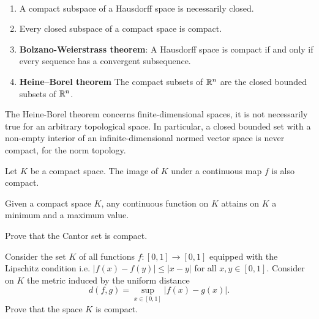 \begin{theorem}
\

\begin{enumerate}
\item A compact subspace of a Hausdorff space is necessarily closed.

\item Every closed subspace of a compact space is compact.

\item {\bf Bolzano-Weierstrass theorem}: A Hausdorff space is compact if and only if every sequence has a convergent subsequence.

\item {\bf Heine--Borel theorem} The compact subsets of $\mathbb{R}^n$ are the closed bounded subsets of $\mathbb{R}^n$.
\end{enumerate}
\end{theorem}
The Heine-Borel theorem concerns finite-dimensional spaces, it is not necessarily true for an arbitrary topological space. In particular, a closed bounded set with a non-empty interior of an infinite-dimensional normed vector space is  never compact, for the norm topology.
 
\begin{theorem} 
Let $K$ be a compact space. The image of $K$ under a continuous map $f$ is also compact.
\end{theorem}

\begin{corollary} Given a compact space $K$, any continuous function on $K$ attains on $K$ a minimum and a maximum value.
\end{corollary}
\begin{ex}\label{Ex:5}
 Prove that  the Cantor set is compact.
\end{ex}
\begin{ex}\label{Ex:6}
 Consider the set $K$ of all functions $ f: [0, 1] \to [0, 1]$ equipped with the Lipschitz condition i.e. $|f(x) - f(y)| \leq |x - y|$ for all $x, y \in [0,1]$. Consider on $K$ the metric induced by the uniform distance 
\[d(f,g)=\sup_{x\in [0,1]}|f(x)-g(x)|.\] Prove that the space $K$ is compact.   
\end{ex}

